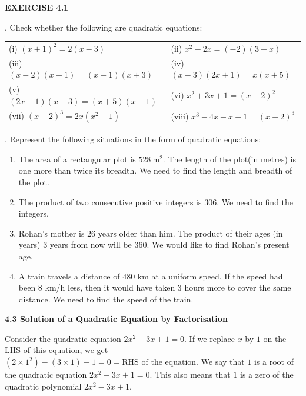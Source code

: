\documentclass[11pt]{article}
\begin{document}
\begin{center}
\textcolor{chapterblue}{\Large\textbf{EXERCISE 4.1}}
\end{center}

. Check whether the following are quadratic equations:

\medskip
\noindent
\begin{tabular}{@{}p{} p{}@{}}
(i) $(x + 1)^2 = 2(x - 3)$
&
(ii) $x^2 - 2x = (-2)(3 - x)$
\\[6pt]

(iii) $(x - 2)(x + 1) = (x - 1)(x + 3)$
&
(iv) $(x - 3)(2x + 1) = x(x + 5)$
\\[6pt]

(v) $(2x - 1)(x - 3) = (x + 5)(x - 1)$
&
(vi) $x^2 + 3x + 1 = (x - 2)^2$
\\[6pt]

(vii) $(x + 2)^3 = 2x(x^2 - 1)$
&
(viii) $x^3 - 4x - x + 1 = (x - 2)^3$
\end{tabular}
\par
\medskip
{}. Represent the following situations in the form of quadratic equations:

\begin{enumerate}
\item[(i)] The area of a rectangular plot is $528\ \text{m}^2$. The length of the plot(in metres) is one more than twice its breadth. We need to find the length and
breadth of the plot.

\item[(ii)] The product of two consecutive positive integers is $306$. We need to
find the integers.

\item[(iii)] Rohan’s mother is $26$ years older than him. The product of their ages
(in years) $3$ years from now will be $360$. We would like to find Rohan’s present
age.

\item[(iv)] A train travels a distance of $480$ km at a uniform speed. If the speed
had been $8$ km/h less, then it would have taken $3$ hours more to cover the same distance. We need to find the speed of the train.
\end{enumerate}


\noindent\textcolor{chapterblue}{\large\textbf{4.3 Solution of a Quadratic Equation by Factorisation}}

Consider the quadratic equation $2x^2 - 3x + 1 = 0$.
If we replace $x$ by $1$ on the LHS of this equation, we get
$(2 \times 1^2) - (3 \times 1) + 1 = 0 = \text{RHS of the equation}$.
We say that $1$ is a root of the quadratic equation $2x^2 - 3x + 1 = 0$. This also means that $1$ is a zero of the quadratic polynomial
$2x^2 - 3x + 1$.
\end{document}
